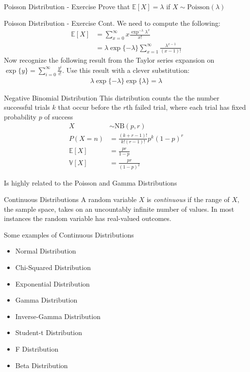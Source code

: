 \documentclass{beamer}
\begin{document}
\begin{frame}{Poisson Distribution - Exercise}
Prove that $\mathbb{E}[X] = \lambda$ if $X\sim\mathrm{Poisson}(\lambda)$
\end{frame}

\begin{frame}{Poisson Distribution - Exercise Cont.}
We need to compute the following:
\begin{align*}
\mathbb{E}[X] &= \sum_{x = 0}^{\infty}x \frac{\exp^{-\lambda}\lambda^{x}}{x!} \\
&= \lambda \exp\{-\lambda\} \sum_{x = 1}^{\infty}\frac{\lambda^{x-1}}{(x-1)!} 
\end{align*}
Now recognize the following result from the Taylor series expansion on $\exp\{y\} = \sum_{i=0}^{\infty}\frac{y^{i}}{i!}$. Use this result with a clever substitution:
\begin{align*}
\lambda \exp\{-\lambda\} \exp\{\lambda\} = \lambda
\end{align*}
\end{frame}

\begin{frame}{Negative Binomial Distribution}
This distribution counts the the number successful trials $k$ that occur before the $r$th failed trial, where each trial has fixed probability $p$ of success
\begin{align*}
X &\sim \mathrm{NB}(p, r) \\
P(X  = n) &= \frac{(k+r - 1)!}{k!(r-1)!} p^{k}(1-p)^{r} \\
\mathbb{E}[X] &= \frac{pr}{1-p} \\
\mathbb{V}[X] &= \frac{p r}{(1-p)^2}
\end{align*}

Is highly related to the Poisson and Gamma Distributions
\end{frame}



\begin{frame}{Continuous Distributions}
A random variable $X$ is \emph{continuous} if the range of $X$, the sample space, takes on an uncountably infinite number of values. In most instances the random variable has real-valued outcomes. 
\newline

Some examples of Continuous Distributions
\begin{itemize}
\item{Normal Distribution}
\item{Chi-Squared Distribution}
\item{Exponential Distribution}
\item{Gamma Distribution}
\item{Inverse-Gamma Distribution}
\item{Student-t Distribution}
\item{F Distribution}
\item{Beta Distribution}
\end{itemize}
\end{frame}
\end{document}
